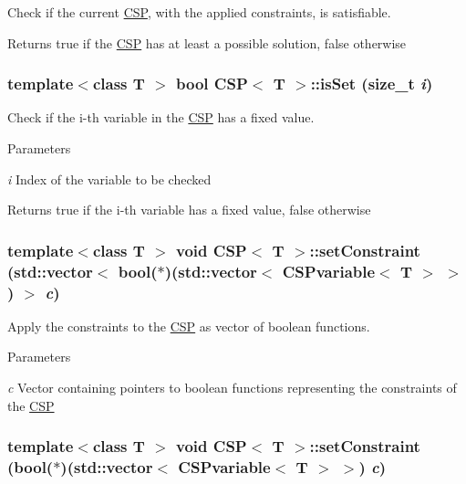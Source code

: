 Check if the current \hyperlink{classCSP}{CSP}, with the applied constraints, is satisfiable. 

\begin{DoxyReturn}{Returns}
true if the \hyperlink{classCSP}{CSP} has at least a possible solution, false otherwise 
\end{DoxyReturn}
\hypertarget{classCSP_a213dafc1aae7b1825371810a511eca4f}{
\subsubsection[{isSet}]{\setlength{\rightskip}{0pt plus 5cm}template$<$class T $>$ bool {\bf CSP}$<$ T $>$::isSet (size\_\-t {\em i})}}
\label{classCSP_a213dafc1aae7b1825371810a511eca4f}


Check if the i-\/th variable in the \hyperlink{classCSP}{CSP} has a fixed value. 


\begin{DoxyParams}{Parameters}
\item[{\em i}]Index of the variable to be checked \end{DoxyParams}
\begin{DoxyReturn}{Returns}
true if the i-\/th variable has a fixed value, false otherwise 
\end{DoxyReturn}
\hypertarget{classCSP_a457e1df05d4ec16be00118bda22fd882}{
\subsubsection[{setConstraint}]{\setlength{\rightskip}{0pt plus 5cm}template$<$class T $>$ void {\bf CSP}$<$ T $>$::setConstraint (std::vector$<$ bool($\ast$)(std::vector$<$ {\bf CSPvariable}$<$ T $>$ $>$) $>$ {\em c})}}
\label{classCSP_a457e1df05d4ec16be00118bda22fd882}


Apply the constraints to the \hyperlink{classCSP}{CSP} as vector of boolean functions. 


\begin{DoxyParams}{Parameters}
\item[{\em c}]Vector containing pointers to boolean functions representing the constraints of the \hyperlink{classCSP}{CSP} \end{DoxyParams}
\hypertarget{classCSP_a534a0d9bd10fb544f94196bf3c386657}{
\subsubsection[{setConstraint}]{\setlength{\rightskip}{0pt plus 5cm}template$<$class T $>$ void {\bf CSP}$<$ T $>$::setConstraint (bool($\ast$)(std::vector$<$ {\bf CSPvariable}$<$ T $>$ $>$) {\em c})}}
\label{classCSP_a534a0d9bd10fb544f94196bf3c386657}


